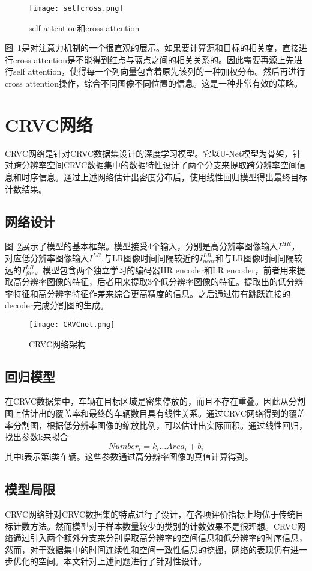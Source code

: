 \begin{figure}[H]
  \centering
  \texttt{[image: selfcross.png]}
  \caption{self attention和cross attention}
  \label{fig:selfcross}
\end{figure}
图~\ref{fig:selfcross}是对注意力机制的一个很直观的展示。如果要计算源和目标的相关度，直接进行cross attention是不能得到红点与蓝点之间的相关关系的。因此需要再源上先进行self attention，使得每一个列向量包含着原先该列的一种加权分布。然后再进行cross attention操作，综合不同图像不同位置的信息。这是一种非常有效的策略。


\section{CRVC网络}
CRVC网络是针对CRVC数据集设计的深度学习模型。它以U-Net模型为骨架，针对跨分辨率空间CRVC数据集中的数据特性设计了两个分支来提取跨分辨率空间信息和时序信息。通过上述网络估计出密度分布后，使用线性回归模型得出最终目标计数结果。
\subsection{网络设计}

图~\ref{fig:CRVCnet}展示了模型的基本框架。模型接受4个输入，分别是高分辨率图像输入$I^{HR}$，对应低分辨率图像输入$I^{LR}$,与LR图像时间间隔较近的$I^{LR}_{near}$和与LR图像时间间隔较远的$I^{LR}_{far}$。模型包含两个独立学习的编码器HR encoder和LR encoder，前者用来提取高分辨率图像的特征，后者用来提取3个低分辨率图像的特征。提取出的低分辨率特征和高分辨率特征作差来综合更高精度的信息。之后通过带有跳跃连接的decoder完成分割图的生成。
\begin{figure}[h]
  \centering
  \texttt{[image: CRVCnet.png]}
  \caption{CRVC网络架构}
  \label{fig:CRVCnet}
\end{figure}


\subsection{回归模型}

在CRVC数据集中，车辆在目标区域是密集停放的，而且不存在重叠。因此从分割图上估计出的覆盖率和最终的车辆数目具有线性关系。通过CRVC网络得到的覆盖率分割图，根据低分辨率图像的缩放比例，可以估计出实际面积。通过线性回归，找出参数k来拟合
\begin{equation}
    Number_i=k_i\dots Area_i+b_i
\end{equation}
其中i表示第i类车辆。这些参数通过高分辨率图像的真值计算得到。

\subsection{模型局限}
CRVC网络针对CRVC数据集的特点进行了设计，在各项评价指标上均优于传统目标计数方法。然而模型对于样本数量较少的类别的计数效果不是很理想。CRVC网络通过引入两个额外分支来分别提取高分辨率的空间信息和低分辨率的时序信息，然而，对于数据集中的时间连续性和空间一致性信息的挖掘，网络的表现仍有进一步优化的空间。本文针对上述问题进行了针对性设计。

